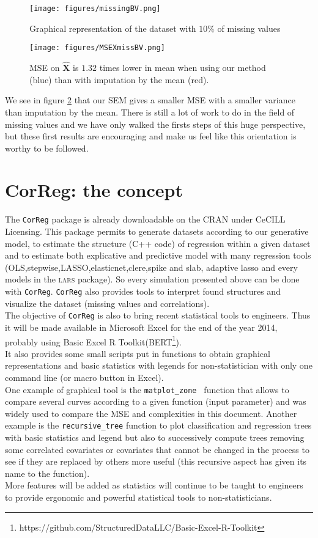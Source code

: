 \documentclass[12pt,a4paper]{report}
\begin{document}
	\begin{figure}[h!]
		\centering
		\texttt{[image: figures/missingBV.png]} 
		\caption{Graphical representation of the dataset with $10\%$ of missing values}\label{missingBV}
	\end{figure}
	\begin{figure}[h!]
		\centering
		\texttt{[image: figures/MSEXmissBV.png]} 
		\caption{MSE on $\hat{\boldsymbol{X}}$ is $1.32$ times lower in mean when using our method (blue) than with imputation by the mean (red).}\label{MSEXmissBV}
	\end{figure}
	We see in figure \ref{MSEXmissBV} that our SEM gives a smaller MSE with a smaller variance than imputation by the mean. There is still a lot of work to do in the field of missing values and we have only walked the firsts steps of this huge perspective, but these first results are encouraging and make us feel like this orientation is worthy to be followed.

\chapter{CorReg: the concept}	
	
		The {\tt CorReg} package is already downloadable on the CRAN under CeCILL Licensing. This package permits to generate datasets according to our generative model, to estimate the structure (C++ code) of regression within a given dataset and to estimate both explicative and predictive model with many regression tools (OLS,stepwise,LASSO,elasticnet,clere,spike and slab, adaptive lasso and every models in the \textsc{lars} package). So every simulation presented above can be done with {\tt CorReg}.
	{\tt CorReg} also provides tools to interpret found structures and visualize the dataset (missing values and correlations). \\%
	The objective of {\tt CorReg} is also to bring recent statistical tools to engineers. Thus it will be made  available in Microsoft Excel for the end of the year 2014, probably using Basic Excel R Toolkit(BERT\footnote{https://github.com/StructuredDataLLC/Basic-Excel-R-Toolkit}). \\
	It also provides some small scripts put in functions to obtain graphical representations and basic statistics with legends for non-statistician with only one command line (or macro button in Excel).\\
	 One example of graphical tool is the {\tt matplot\_zone } function that allows to compare several curves according to a given function (input parameter) and was widely used to compare the MSE and complexities in this document. Another example is the {\tt recursive\_tree} function to plot classification and regression trees with basic statistics and legend but also to successively compute trees removing some correlated covariates or covariates that cannot be changed in the process to see if they are replaced by others more useful (this recursive aspect has given its name to the function).\\
	More features will be added as statistics will continue to be taught to engineers to provide ergonomic and powerful statistical tools to non-statisticians. 
\end{document}
